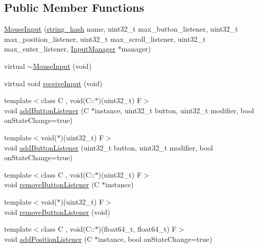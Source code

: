 \subsection*{Public Member Functions}
\begin{DoxyCompactItemize}
\item 
\hyperlink{classcrap_1_1_mouse_input_a51f0633d6dbcc0ad9f262ef339b8542a}{Mouse\+Input} (\hyperlink{classcrap_1_1string__hash}{string\+\_\+hash} name, uint32\+\_\+t max\+\_\+button\+\_\+listener, uint32\+\_\+t max\+\_\+position\+\_\+listener, uint32\+\_\+t max\+\_\+scroll\+\_\+listener, uint32\+\_\+t max\+\_\+enter\+\_\+listener, \hyperlink{classcrap_1_1_input_manager}{Input\+Manager} $\ast$manager)
\item 
virtual \hyperlink{classcrap_1_1_mouse_input_a24df7fb1be6649376e9cd019eadf8ed2}{$\sim$\+Mouse\+Input} (void)
\item 
virtual void \hyperlink{classcrap_1_1_mouse_input_afc16f0005b50c8724aedc99ab1168177}{receive\+Input} (void)
\item 
{\footnotesize template$<$class C , void(\+C\+::$\ast$)(uint32\+\_\+t) F$>$ }\\void \hyperlink{classcrap_1_1_mouse_input_af83e4a3bbbaeb93ab14d36b8f902c652}{add\+Button\+Listener} (C $\ast$instance, uint32\+\_\+t button, uint32\+\_\+t modifier, bool on\+State\+Change=true)
\item 
{\footnotesize template$<$void($\ast$)(uint32\+\_\+t) F$>$ }\\void \hyperlink{classcrap_1_1_mouse_input_ad58891beb8fb0e55656745f7db150054}{add\+Button\+Listener} (uint32\+\_\+t button, uint32\+\_\+t modifier, bool on\+State\+Change=true)
\item 
{\footnotesize template$<$class C , void(\+C\+::$\ast$)(uint32\+\_\+t) F$>$ }\\void \hyperlink{classcrap_1_1_mouse_input_a5439590747a7b264d6fc20a1a4f48e44}{remove\+Button\+Listener} (C $\ast$instance)
\item 
{\footnotesize template$<$void($\ast$)(uint32\+\_\+t) F$>$ }\\void \hyperlink{classcrap_1_1_mouse_input_a84e6ddac695af74ccf045ec07a972dbc}{remove\+Button\+Listener} (void)
\item 
{\footnotesize template$<$class C , void(\+C\+::$\ast$)(float64\+\_\+t, float64\+\_\+t) F$>$ }\\void \hyperlink{classcrap_1_1_mouse_input_af25d8c7e87a6b9b43bb3f518e28a2119}{add\+Position\+Listener} (C $\ast$instance, bool on\+State\+Change=true)
\item 

\end{DoxyCompactItemize}
